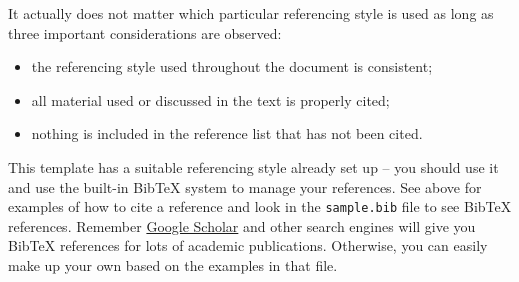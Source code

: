 It actually does not matter which particular referencing style is used as long as three important considerations are observed:
\begin{itemize}
\item the referencing style used throughout the document is consistent;
\item all material used or discussed in the text is properly cited;
\item nothing is included in the reference list that has not been cited.
\end{itemize}

This template has a suitable referencing style already set up -- you should use it and use the built-in BibTeX system to manage your references. See above for examples of how to cite a reference and look in the \texttt{sample.bib} file to see BibTeX references. Remember \href{http://scholar.google.com}{Google Scholar} and other search engines will give you BibTeX references for lots of academic publications. Otherwise, you can easily make up your own based on the examples in that file.